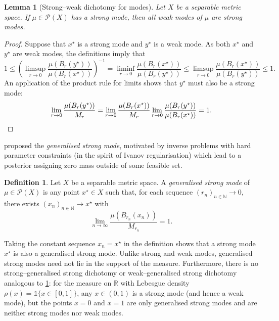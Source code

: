 \documentclass[11pt]{article}
\newcommand*{\cball}[2]{B_{#2}(#1)}
\newcommand*{\defterm}{\emph}%
\newcommand*{\Naturals}{\mathbb{N}}
\newcommand*{\one}{\mathds{1}}
\newcommand*{\prob}[1]{\mathscr{P}(#1)}
\newcommand*{\Reals}{\mathbb{R}}
\renewcommand*{\leq}{\leqslant}
\newcommand*{\crcdf}[2]{\mu(\cball{#1}{#2})}
\theoremstyle{plain}
\newtheorem{lemma}[theorem]{Lemma}
\theoremstyle{definition}
\newtheorem{definition}[theorem]{Definition}
\numberwithin{equation}{section}
\numberwithin{figure}{section}
\numberwithin{table}{section}
\begin{document}
\begin{lemma}[Strong--weak dichotomy for modes]
	\label{lem:all_weak_or_strong}
	Let $X$ be a separable metric space.
	If $\mu \in \prob{X}$ has a strong mode, then all weak modes of $\mu$ are strong modes.
\end{lemma}

\begin{proof}
	Suppose that $x^{\star}$ is a strong mode and $y^{\star}$ is a weak mode.
	As both $x^{\star}$ and $y^{\star}$ are weak modes, the definitions imply that
	\begin{equation*}
		1 \leq \left(\limsup_{r \to 0} \frac{\crcdf{y^{\star}}{r}}{\crcdf{x^{\star}}{r}}\right)^{-1} = \liminf_{r \to 0} \frac{\crcdf{x^{\star}}{r}}{\crcdf{y^{\star}}{r}} \leq \limsup_{r \to 0} \frac{\crcdf{x^{\star}}{r}}{\crcdf{y^{\star}}{r}} \leq 1.
	\end{equation*}
	An application of the product rule for limits shows that $y^{\star}$ must also be a strong mode:
	\begin{equation*}
		\lim_{r \to 0} \frac{\crcdf{y^{\star}}{r}}{M_r} = \lim_{r \to 0} \frac{\crcdf{x^{\star}}{r}}{M_r} \lim_{r \to 0} \frac{\crcdf{y^{\star}}{r}}{\crcdf{x^{\star}}{r}} = 1.
		\qedhere
	\end{equation*}
\end{proof}

\citet{ClasonHelinKretschmannPiiroinen2019} proposed the \defterm{generalised strong mode}, motivated by inverse problems with hard parameter constraints (in the spirit of Ivanov regularisation) which lead to a posterior assigning zero mass outside of some feasible set.

\begin{definition}
	\label{def:generalised_mode}
	Let $X$ be a separable metric space.
	A \defterm{generalised strong mode} of $\mu \in \prob{X}$ is any point $x^{\star} \in X$ such that, for each sequence $(r_n)_{n \in \Naturals} \to 0$, there exists $(x_n)_{n \in \Naturals} \to x^{\star}$ with
	\begin{equation*}
		\lim_{n \to \infty} \frac{\crcdf{x_n}{r_n}}{M_{r_n}} = 1.
	\end{equation*}
\end{definition}

Taking the constant sequence $x_n = x^{\star}$ in the definition shows that a strong mode $x^{\star}$ is also a generalised strong mode.
Unlike strong and weak modes, generalised strong modes need not lie in the support of the measure.
Furthermore, there is no strong--generalised strong dichotomy or weak--generalised strong dichotomy analogous to \cref{lem:all_weak_or_strong}:
for the measure on $\Reals$ with Lebesgue density $\rho(x) = \one\{x \in [0, 1]\}$, any $x \in (0, 1)$ is a strong mode (and hence a weak mode), but the points $x = 0$ and $x = 1$ are only generalised strong modes and are neither strong modes nor weak modes.
\end{document}
